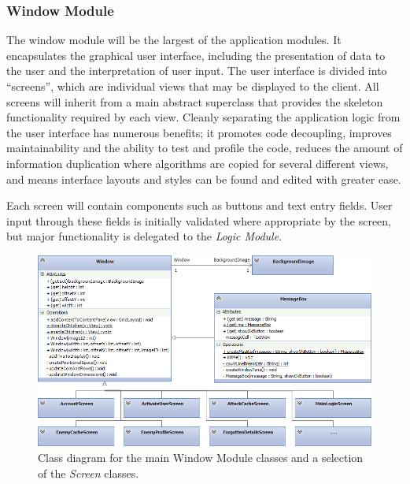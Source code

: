 \subsubsection{Window Module}
The window module will be the largest of the application modules. It encapsulates the graphical user interface, including the presentation of data to the user and the interpretation of user input. The user interface is divided into ``screens'', which are individual views that may be displayed to the client. All screens will inherit from a main abstract superclass that provides the skeleton functionality required by each view. Cleanly separating the application logic from the user interface has numerous benefits; it promotes code decoupling, improves maintainability and the ability to test and profile the code, reduces the amount of information duplication where algorithms are copied for several different views, and means interface layouts and styles can be found and edited with greater ease.

Each screen will contain components such as buttons and text entry fields. User input through these fields is initially validated where appropriate by the screen, but major functionality is delegated to the \emph{Logic Module}.

\begin{figure}[h!]
    \centering
    \includegraphics[width=\textwidth]{windowcd}
    \caption{Class diagram for the main Window Module classes and a selection of the \emph{Screen} classes.}
\end{figure}
